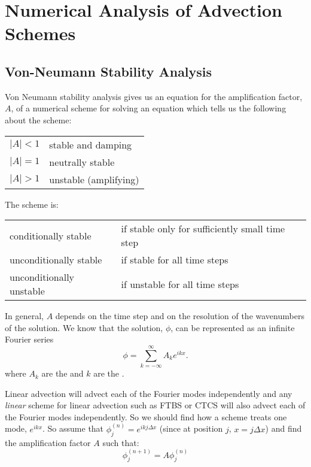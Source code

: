 \chapter{Numerical Analysis of Advection Schemes}
\label{chap:advectionAnalysis}

\section{Von-Neumann Stability Analysis}

Von Neumann stability analysis gives us an equation for the amplification factor, $A$, of a numerical scheme for solving an equation which tells us the following about the scheme:\\
{\renewcommand{\arraystretch}{1.1}\begin{tabular}{ll}
$|A|<1$ & stable and damping\\
$|A|=1$ & neutrally stable \\
$|A|>1$ & unstable (amplifying)\\
\end{tabular}

The scheme is:

\begin{tabular}{ll}
conditionally stable & if stable only for sufficiently small time step\\
unconditionally stable & if stable for all time steps\\
unconditionally unstable & if unstable for all time steps\\
\end{tabular}

In general, $A$ depends on the time step and on the resolution of the  wavenumbers of the solution. We know that the solution, $\phi$, can be represented as an infinite Fourier series
\begin{equation}
\phi = \sum_{k=-\infty}^{\infty} A_k e^{ikx}.
\end{equation}
where $A_k$ are the  and $k$ are the .

Linear advection will advect each of the Fourier modes independently and any {\it linear} scheme for linear advection such as FTBS or CTCS will also advect each of the Fourier modes independently. So we should find how a scheme treats one mode, $e^{ikx}$. So assume that $\phi_j^{(n)}=e^{ikj\Delta x}$ (since at position $j$, $x=j\Delta x$) and find the amplification factor $A$ such that:
\begin{equation}
\phi_j^{(n+1)} = A \phi_j^{(n)}
\end{equation}


}
